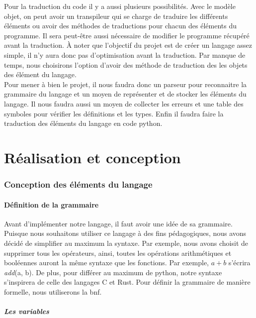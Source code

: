 \documentclass[a4paper]{article}%
\begin{document}
Pour la traduction du code il y a aussi plusieurs possibilités. Avec le modèle
objet, on peut avoir un transpileur qui se charge de traduire les différents
éléments ou avoir des méthodes de traductions pour chacun des éléments du
programme. Il sera peut-être aussi nécessaire de modifier le programme récupéré
avant la traduction. À noter que l'objectif du projet est de créer un langage
assez simple, il n'y aura donc pas d'optimisation avant la traduction. Par
manque de temps, nous choisirons l'option d'avoir des méthode de traduction des
les objets des élément du langage.\\

Pour mener à bien le projet, il nous faudra donc un parseur pour reconnaitre la
grammaire du langage et un moyen de représenter et de stocker les éléments du
langage. Il nous faudra aussi un moyen de collecter les erreurs et une table des
symboles pour vérifier les définitions et les types. Enfin il faudra faire la
traduction des éléments du langage en code python.

\clearpage
\part{Réalisation et conception}

\section{Conception des éléments du langage}

\subsection{Définition de la grammaire}

Avant d'implémenter notre langage, il faut avoir une idée de sa grammaire.
Puisque nous souhaitons utiliser ce langage à des fins pédagogiques, nous avons
décidé de simplifier au maximum la syntaxe. Par exemple, nous avons choisit de
supprimer tous les opérateurs, ainsi, toutes les opérations arithmétiques et
booléennes auront la même syntaxe que les fonctions. Par exemple, $a+b$ s'écrira
\textit{add}(a, b). De plus, pour différer au maximum de python, notre syntaxe
s'inspirera de celle des langages C et Rust. Pour définir la grammaire de
manière formelle, nous utiliserons la \gls{bnf}.

\subsubsection*{Les variables}
\end{document}
